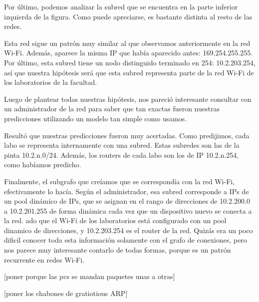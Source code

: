 Por último, podemos analizar la subred que se encuentra en la parte inferior izquierda de la figura. Como puede apreciarse, es bastante distinta al resto de las redes. 

Esta red sigue un patrón muy similar al que observamos anteriormente en la red Wi-Fi. Además, aparece la misma IP que había aparecido antes: 169.254.255.255. Por último, esta subred tiene un nodo distinguido terminado en 254: 10.2.203.254, así que nuestra hipótesis será que esta subred representa parte de la red Wi-Fi de los laboratorios de la facultad.


Luego de plantear todas nuestras hipótesis, nos pareció interesante consultar con un administrador de la red para saber que tan exactas fueron nuestras predicciones utilizando un modelo tan simple como usamos.

Resultó que nuestras predicciones fueron muy acertadas. Como predijimos, cada labo se representa internamente con una subred. Estas subredes son las de la pinta 10.2.n.0/24. Además, los routers de cada labo son los de IP 10.2.n.254, como habíamos predicho.

Finalmente, el subgrafo que creíamos que se correspondía con la red Wi-Fi, efectivamente lo hacía. Según el administrador, esa subred corresponde a IPs de un pool dinámico de IPs, que se asignan en el rango de direcciones de 10.2.200.0 a 10.2.201.255 de forma dinámica cada vez que un dispositivo nuevo se conecta a la red. ado que el Wi-Fi de los laboratorios está configurado con un pool dinamico de direcciones, y 10.2.203.254 es el router de la red. Quizás era un poco dificil
conocer toda esta información solamente con el grafo de conexiones, pero nos parece muy interesante contarlo de todas formas, porque es un patrón recurrente en redes Wi-Fi.

[poner porque las pcs se mandan paquetes unas a otras]

[poner los chabones de gratiotious ARP]
